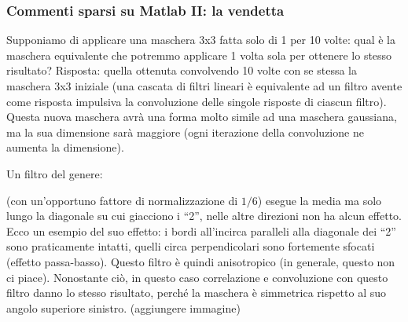 \documentclass[a4paper,11pt]{article}
\begin{document}
\subsubsection{Commenti sparsi su Matlab II: la vendetta}
Supponiamo di applicare una maschera 3x3 fatta solo di 1 per 10 volte: qual è la maschera equivalente che potremmo applicare 1 volta sola per ottenere
lo stesso risultato? Risposta: quella ottenuta convolvendo 10 volte con se stessa la maschera 3x3 iniziale (una cascata di filtri lineari è equivalente
ad un filtro avente come risposta impulsiva la convoluzione delle singole risposte di ciascun filtro). Questa nuova maschera avrà una forma
molto simile ad una maschera gaussiana, ma la sua dimensione sarà maggiore (ogni iterazione della convoluzione ne aumenta la dimensione).
\par
Un filtro del genere:

\begin{center}
\end{center}

(con un'opportuno fattore di normalizzazione di $1/6$) esegue la media ma solo lungo la diagonale su cui giacciono i ``2'', nelle altre direzioni non ha alcun
effetto. Ecco un esempio del suo effetto: i bordi all'incirca paralleli alla diagonale dei ``2'' sono praticamente intatti, quelli circa perpendicolari
sono fortemente sfocati (effetto passa-basso). Questo filtro è quindi anisotropico (in generale, questo non ci piace). Nonostante ciò,
in questo caso correlazione e convoluzione con questo filtro danno lo stesso risultato, perché la maschera è simmetrica rispetto al suo angolo
superiore sinistro. (aggiungere immagine)
\end{document}
